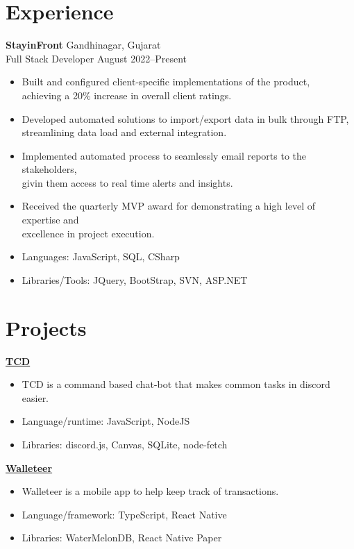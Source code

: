 \documentclass[a4paper,10pt]{article}
\begin{document}
\section{Experience}
\noindent
\textbf{StayinFront} \hfill Gandhinagar, Gujarat \\
Full Stack Developer \hfill August 2022--Present
\begin{itemize}
    \item Built and configured client-specific implementations of the product, \\
          achieving a 20\% increase in overall client ratings.
    \item Developed automated solutions to import/export data in bulk through FTP, \\
          streamlining data load and external integration.
    \item Implemented automated process to seamlessly email reports to the stakeholders, \\
          givin them access to real time alerts and insights.
    \item Received the quarterly MVP award for demonstrating a high level of expertise and \\ excellence in project execution.
    \item Languages: JavaScript, SQL, CSharp
    \item Libraries/Tools: JQuery, BootStrap, SVN, ASP.NET
\end{itemize}

\section{Projects}
\setlength\parindent{0pt}

\href{https://github.com/jaydamani/TCD}{\textbf{TCD}}
\begin{itemize}
    \item TCD is a command based chat-bot that makes common tasks in discord easier.
    \item Language/runtime: JavaScript, NodeJS
    \item Libraries: discord.js, Canvas, SQLite, node-fetch
\end{itemize}

\href{https://github.com/jaydamani/walleteer}{\textbf{Walleteer}}
\begin{itemize}
    \item Walleteer is a mobile app to help keep track of transactions.
    \item Language/framework: TypeScript, React Native
    \item Libraries: WaterMelonDB, React Native Paper
\end{itemize}
\end{document}
